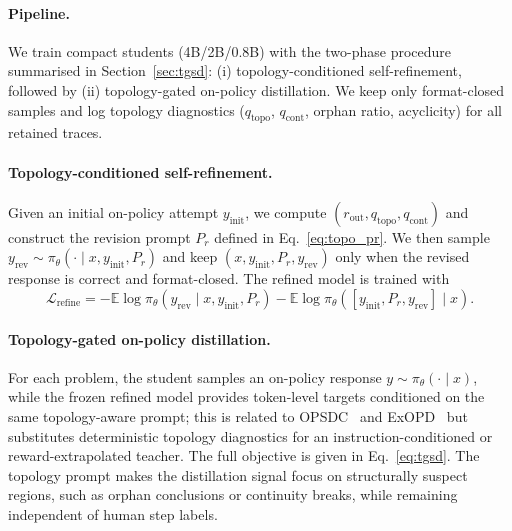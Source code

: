     \paragraph{Pipeline.}
    We train compact students (4B/2B/0.8B) with the two-phase \framework
    procedure summarised in Section~\ref{sec:tgsd}:
    (i) topology-conditioned self-refinement, followed by
    (ii) topology-gated on-policy distillation.
    We keep only format-closed samples and log topology diagnostics
    ($q_{\mathrm{topo}}$, $q_{\mathrm{cont}}$, orphan ratio, acyclicity) for
    all retained traces.
    
    \paragraph{Topology-conditioned self-refinement.}
    Given an initial on-policy attempt $y_{\mathrm{init}}$, we compute
    $(r_{\mathrm{out}},q_{\mathrm{topo}},q_{\mathrm{cont}})$ and construct the
    revision prompt $P_r$ defined in Eq.~\ref{eq:topo_pr}. We then sample
    $y_{\mathrm{rev}}\!\sim\!\pi_\theta(\cdot\mid x,y_{\mathrm{init}},P_r)$ and
    keep $(x,y_{\mathrm{init}},P_r,y_{\mathrm{rev}})$ only when the revised
    response is correct and format-closed. The refined model is trained with
    \begin{equation}
    \label{eq:srt}
    \mathcal{L}_{\mathrm{refine}} =
    -\mathbb{E}\log\pi_\theta(y_{\mathrm{rev}}\mid x,y_{\mathrm{init}},P_r)
    -\mathbb{E}\log\pi_\theta([y_{\mathrm{init}},P_r,y_{\mathrm{rev}}]\mid x).
    \end{equation}
    
    \paragraph{Topology-gated on-policy distillation.}
    For each problem, the student samples an on-policy response
    $y\!\sim\!\pi_\theta(\cdot\mid x)$, while the frozen refined model provides
    token-level targets conditioned on the same topology-aware prompt; this is
    related to OPSDC~\citep{opsdc2026} and ExOPD~\citep{yang2026exopd} but
    substitutes deterministic topology diagnostics for an instruction-conditioned
    or reward-extrapolated teacher. The full objective is given in Eq.~\ref{eq:tgsd}.
    The topology prompt makes the distillation signal focus on structurally
    suspect regions, such as orphan conclusions or continuity breaks, while
    remaining independent of human step labels.
    
